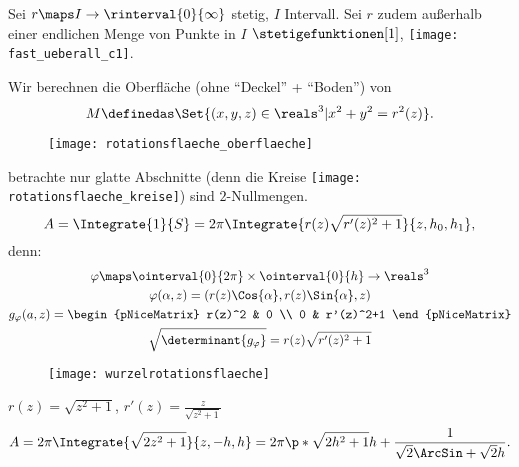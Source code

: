 \begin{beispiel*}[Rotationsflächen]
  Sei \( r\maps I\to \rinterval{0}{\infty} \) stetig, \( I \) Intervall. Sei \( r \) zudem außerhalb einer endlichen Menge von Punkte in \( I \) \( \stetigefunktionen[1] \), \zb \texttt{[image: fast\_ueberall\_c1]}.

  Wir berechnen die Oberfläche (ohne \enquote{Deckel} + \enquote{Boden}) von
  \begin{equation*}
    M\definedas \Set{(x,y,z)\in \reals^3|x^2+y^2=r^2(z)}.
  \end{equation*}
  \begin{figure}[H]
    \centering
    \texttt{[image: rotationsflaeche\_oberflaeche]}
    \label{fig:rotationsflaeche_oberflaeche}
  \end{figure}
  \Obda betrachte nur glatte Abschnitte (denn die Kreise \texttt{[image: rotationsflaeche\_kreise]}) sind \( 2 \)-Nullmengen.
  \begin{equation*}
    A=\Integrate{1}{S}=2\pi \Integrate{r(z)\sqrt{r'(z)^2+1}}{z,h_0,h_1},
  \end{equation*}
  denn:
  \begin{gather*}
    \varphi\maps \ointerval{0}{2\pi}\times \ointerval{0}{h}\to \reals^3\\
    \varphi(\alpha,z)=(r(z)\Cos{\alpha},r(z)\Sin{\alpha},z)\\
    g_{\varphi}(a,z)=\begin{pNiceMatrix} r(z)^2 & 0 \\ 0 & r'(z)^2+1 \end{pNiceMatrix}\\
    \sqrt{\determinant{g_{\varphi}}}=r(z)\sqrt{r'(z)^2+1}
  \end{gather*}
  \begin{beispiel*}
    \begin{figure}[H]
      \centering
      \texttt{[image: wurzelrotationsflaeche]}
      \label{fig:wurzelrotationsflaeche}
    \end{figure}
    \( r(z)=\sqrt{z^2+1} \), \( r'(z)=\frac{z}{\sqrt{z^2+1}} \)
    \begin{equation*}
      A=2\pi \Integrate{\sqrt{2z^2+1}}{z,-h,h}=2\pi\p*{\sqrt{2h^2+1}h+\frac{1}{\sqrt{2}\ArcSin+{\sqrt{2}h}}}.
    \end{equation*}
  \end{beispiel*}
\end{beispiel*}

